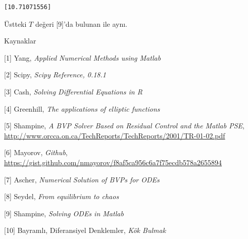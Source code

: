 \documentclass[12pt,fleqn]{article}\usepackage{../../common}
\begin{document}
\begin{verbatim}
[10.71071556]
\end{verbatim}

Üstteki $T$ değeri [9]'da bulunan ile aynı. 

Kaynaklar

[1] Yang, {\em Applied Numerical Methods using Matlab}

[2] Scipy, {\em Scipy Reference, 0.18.1}

[3] Cash, {\em Solving Differential Equations in R}

[4] Greenhill, {\em The applications of elliptic functions}

[5] Shampine, {\em A BVP Solver Based on Residual Control and the Matlab PSE}, 
    \url{http://www.orcca.on.ca/TechReports/TechReports/2001/TR-01-02.pdf}

[6] Mayorov, {\em Github}, \url{https://gist.github.com/nmayorov/f8af5ca956c6a7f75ecdb578a2655894}

[7] Ascher, {\em Numerical Solution of BVPs for ODEs}

[8] Seydel, {\em From equilibrium to chaos}

[9] Shampine, {\em Solving ODEs in Matlab}

[10] Bayramlı, Diferansiyel Denklemler, {\em Kök Bulmak}


    
\end{document}
